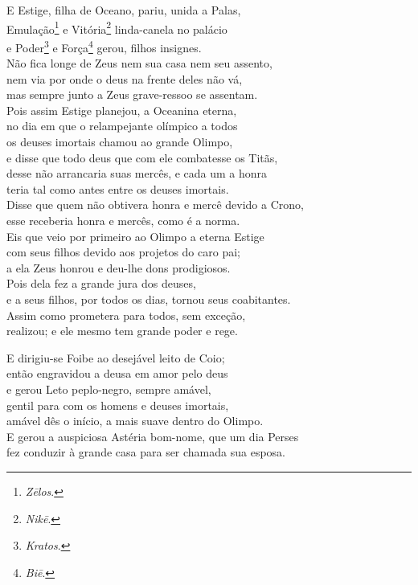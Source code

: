 \quad{}E Estige, filha de Oceano, pariu, unida a Palas,\\
Emulação\footnote{\emph{Zēlos}.} e Vitória\footnote{\emph{Nikē}.} linda-canela no palácio\\
e Poder\footnote{\emph{Kratos}.} e Força\footnote{\emph{Biē}.} gerou, filhos insignes. \\
Não fica longe de Zeus nem sua casa nem seu assento,\\
nem via por onde o deus na frente deles não vá,\\
mas sempre junto a Zeus grave-ressoo se assentam.\\
Pois assim Estige planejou, a Oceanina eterna,\\
no dia em que o relampejante olímpico a todos \\
os deuses imortais chamou ao grande Olimpo,\\
e disse que todo deus que com ele combatesse os Titãs,\\
desse não arrancaria suas mercês, e cada um a honra\\
teria tal como antes entre os deuses imortais.\\
Disse que quem não obtivera honra e mercê devido a Crono, \\
esse receberia honra e mercês, como é a norma.\\
Eis que veio por primeiro ao Olimpo a eterna Estige\\
com seus filhos devido aos projetos do caro pai;\\
a ela Zeus honrou e deu-lhe dons prodigiosos.\\
Pois dela fez a grande jura dos deuses, \\
e a seus filhos, por todos os dias, tornou seus coabitantes.\\
Assim como prometera para todos, sem exceção,\\
realizou; e ele mesmo tem grande poder e rege.

\quad{}E dirigiu-se Foibe ao desejável leito de Coio;\\
então engravidou a deusa em amor pelo deus \\
e gerou Leto peplo-negro, sempre amável,\\
gentil para com os homens e deuses imortais,\\
amável dês o início, a mais suave dentro do Olimpo.\\
E gerou a auspiciosa Astéria bom-nome, que um dia Perses\\
fez conduzir à grande casa para ser chamada sua esposa. 

